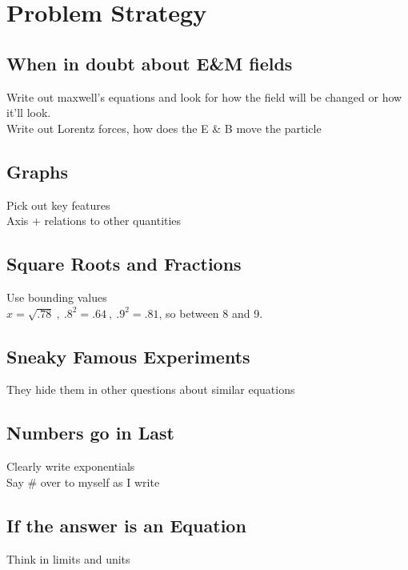 \documentclass[10pt,a4paper]{article}
\begin{document}
\section{Problem Strategy} %
\label{sec:problem_strategy}

\subsection{When in doubt about E\&M fields} %
\label{sub:subsection_name}
Write out maxwell's equations and look for how the field will be changed or how it'll look. \\
Write out Lorentz forces, how does the E \& B move the particle 

\subsection{Graphs} %
\label{sub:graphs}
Pick out key features\\
Axis + relations to other quantities

\subsection{Square Roots and Fractions} %
\label{sub:square_roots_and_fractions}
Use bounding values\\
$x = \sqrt{.78}~,~ .8^2 = .64~,~ .9^2 = .81$, so between 8 and 9.

\subsection{Sneaky Famous Experiments} %
\label{sub:snenaky_famous_experiments}
They hide them in other questions about similar equations

\subsection{Numbers go in Last} %
\label{sub:numbers_go_in_last}
Clearly write exponentials\\
Say \# over to myself as I write

\subsection{If the answer is an Equation} %
\label{sub:if_the_answer_is_an_equation}
Think in limits and units
\end{document}
